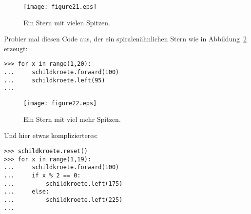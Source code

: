 \begin{figure}
\begin{center}
\texttt{[image: figure21.eps]}
\end{center}
\caption{Ein Stern mit vielen Spitzen.}\label{fig21}
\end{figure}

\noindent
Probier mal diesen Code aus, der ein spiralenähnlichen Stern wie in Abbildung~\ref{fig22} erzeugt:

\begin{Verbatim}[frame=single]
>>> for x in range(1,20):
...     schildkroete.forward(100)
...     schildkroete.left(95)
...
\end{Verbatim}

\begin{figure}
\begin{center}
\texttt{[image: figure22.eps]}
\end{center}
\caption{Ein Stern mit viel mehr Spitzen.}\label{fig22}
\end{figure}

\noindent
Und hier etwas komplizierteres:

\begin{Verbatim}[frame=single]
>>> schildkroete.reset()
>>> for x in range(1,19):
...     schildkroete.forward(100)
...     if x % 2 == 0:
...         schildkroete.left(175)
...     else:
...         schildkroete.left(225)
...
\end{Verbatim}


